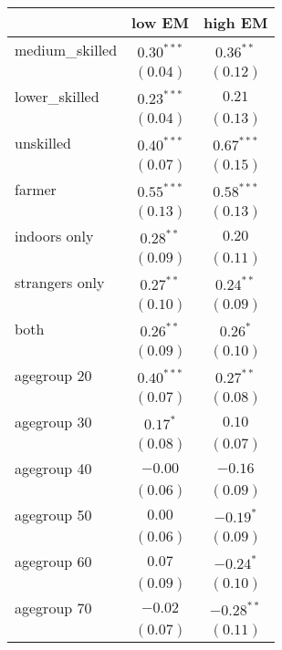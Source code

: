 
\begin{table}
\begin{center}
\begin{tabular}{l c c}
\hline
 & low EM & high EM \\
\hline
medium\_skilled & $0.30^{***}$  & $0.36^{**}$   \\
                & $(0.04)$      & $(0.12)$      \\
lower\_skilled  & $0.23^{***}$  & $0.21$        \\
                & $(0.04)$      & $(0.13)$      \\
unskilled       & $0.40^{***}$  & $0.67^{***}$  \\
                & $(0.07)$      & $(0.15)$      \\
farmer          & $0.55^{***}$  & $0.58^{***}$  \\
                & $(0.13)$      & $(0.13)$      \\
indoors only    & $0.28^{**}$   & $0.20$        \\
                & $(0.09)$      & $(0.11)$      \\
strangers only  & $0.27^{**}$   & $0.24^{**}$   \\
                & $(0.10)$      & $(0.09)$      \\
both            & $0.26^{**}$   & $0.26^{*}$    \\
                & $(0.09)$      & $(0.10)$      \\
agegroup 20     & $0.40^{***}$  & $0.27^{**}$   \\
                & $(0.07)$      & $(0.08)$      \\
agegroup 30     & $0.17^{*}$    & $0.10$        \\
                & $(0.08)$      & $(0.07)$      \\
agegroup 40     & $-0.00$       & $-0.16$       \\
                & $(0.06)$      & $(0.09)$      \\
agegroup 50     & $0.00$        & $-0.19^{*}$   \\
                & $(0.06)$      & $(0.09)$      \\
agegroup 60     & $0.07$        & $-0.24^{*}$   \\
                & $(0.09)$      & $(0.10)$      \\
agegroup 70     & $-0.02$       & $-0.28^{**}$  \\
                & $(0.07)$      & $(0.11)$      \\

\end{tabular}
\end{center}
\end{table}

